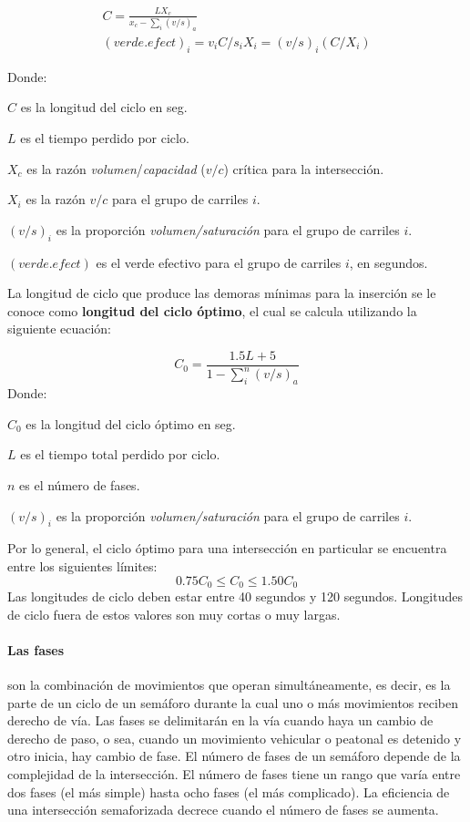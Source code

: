 $$
\begin{array}{c}
C = \displaystyle \frac{LX_c}{x_c - \sum_{i}(v/s)_a } \\[0.5cm]
(verde.efect)_i = v_iC/s_iX_i=(v/s)_i(C/X_i)
\end{array}
$$

Donde:
{\setlength{\baselineskip}{0.7\baselineskip}\begin{description}
	\item $C$ es la longitud del ciclo en seg.
	\item $L$ es el tiempo perdido por ciclo.
	\item $X_c$ es la razón \emph{volumen}/\emph{capacidad} ($v/c$) crítica para la intersección.
	\item $X_i$ es la razón $v/c$ para el grupo de carriles $i$.
	\item $(v/s)_i$ es la proporción \emph{volumen/saturación} para el grupo de carriles $i$.
	\item $(verde.efect)$ es el verde efectivo para el grupo de carriles $i$, en segundos.
\end{description}}

La longitud de ciclo que produce las demoras mínimas para la inserción se le conoce como \textbf{longitud del ciclo óptimo}, el cual se calcula utilizando la siguiente ecuación:

$$ C_0 = {\displaystyle \frac{1.5L + 5}{1 - \sum_i^n(v/s)_a}}  $$
Donde:
{\setlength{\baselineskip}{0.7\baselineskip}\begin{description}
		\item $C_0$ es la longitud del ciclo óptimo en seg.
		\item $L$ es el tiempo total perdido por ciclo.
		\item $n$ es el número de fases.
		\item $(v/s)_i$ es la proporción \emph{volumen/saturación} para el grupo de carriles $i$.
\end{description}}

Por lo general, el ciclo óptimo para una intersección en particular se encuentra entre los siguientes límites:
$$ 0.75C_0 \leq C_0 \leq 1.50C_0$$
Las longitudes de ciclo deben estar entre 40 segundos y 120 segundos. Longitudes de ciclo fuera de estos valores son muy cortas o muy largas.

\paragraph{Las fases} son la combinación de movimientos que operan simultáneamente, es decir, es la parte de un ciclo de un semáforo durante la cual uno o más movimientos reciben derecho de vía. Las fases se delimitarán en la vía cuando haya un cambio de derecho de paso, o sea, cuando un movimiento vehicular o peatonal es detenido y otro inicia, hay cambio de fase. El número de fases de un semáforo depende de la complejidad de la intersección. El número de fases tiene un rango que varía entre dos fases (el más simple) hasta ocho fases (el más complicado). La eficiencia de una intersección semaforizada decrece cuando el número de fases se aumenta.

